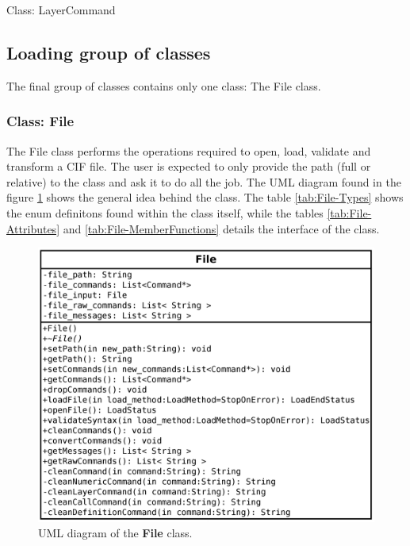 \documentclass[11pt,twoside,openany,x11names,svgnames]{memoir}
\begin{document}
Class: LayerCommand

\subsection{Loading group of classes}\label{Loading-group-of-classes}

The final group of classes contains only one class: The File class.

\subsubsection{Class: File}\label{Class-File}

The File class performs the operations required to open, load, validate and transform a CIF file. The user is expected to only provide the path (full or relative) to the class and ask it to do all the job. The UML diagram found in the figure \ref{fig:class-file} shows the general idea behind the class. The table \ref{tab:File-Types} shows the enum definitons found within the class itself, while the tables \ref{tab:File-Attributes} and \ref{tab:File-MemberFunctions} details the interface of the class.

\begin{figure}
	\centering
	\includegraphics[scale=0.18, clip=true, trim= 0pt 0pt 0pt 0pt]{images/chapter03-image34}
	\caption{UML diagram of the \textbf{File} class.}
	\label{fig:class-file}
\end{figure}
\end{document}
